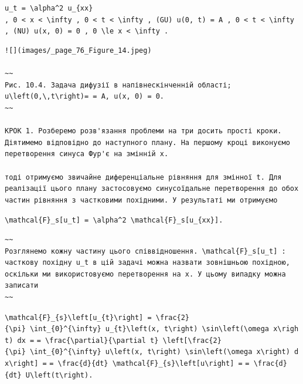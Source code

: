 \documentclass[
  ukrainian,
]{article}
\begin{document}
\texttt{u\_t\ =\ \textbackslash{}alpha\^{}2\ u\_\{xx\}}
\texttt{,\ 0\ \textless{}\ x\ \textless{}\ \textbackslash{}infty\ ,\ 0\ \textless{}\ t\ \textless{}\ \textbackslash{}infty\ ,\ (GU)\ u(0,\ t)\ =\ A\ ,\ 0\ \textless{}\ t\ \textless{}\ \textbackslash{}infty\ ,\ (NU)\ u(x,\ 0)\ =\ 0\ ,\ 0\ \textbackslash{}le\ x\ \textless{}\ \textbackslash{}infty\ .}

\begin{verbatim}
![](images/_page_76_Figure_14.jpeg)

~~
Рис. 10.4. Задача дифузії в напівнескінченній області; u\left(0,\,t\right)= = A, u(x, 0) = 0.
~~

КРОК 1. Розберемо розв'язання проблеми на три досить прості кроки. Діятимемо відповідно до наступного плану. На першому кроці виконуємо перетворення синуса Фур'є на змінній x.

тоді отримуємо звичайне диференціальне рівняння для змінної t. Для реалізації цього плану застосовуємо синусоїдальне перетворення до обох частин рівняння з частковими похідними. У результаті ми отримуємо
\end{verbatim}

\texttt{\textbackslash{}mathcal\{F\}\_s{[}u\_t{]}\ =\ \textbackslash{}alpha\^{}2\ \textbackslash{}mathcal\{F\}\_s{[}u\_\{xx\}{]}.}

\begin{verbatim}
~~
Розглянемо кожну частину цього співвідношення. \mathcal{F}_s[u_t] : часткову похідну u_t в цій задачі можна назвати зовнішньою похідною, оскільки ми використовуємо перетворення на x. У цьому випадку можна записати
~~
\end{verbatim}

\texttt{\textbackslash{}mathcal\{F\}\_\{s\}\textbackslash{}left{[}u\_\{t\}\textbackslash{}right{]}\ =\ \textbackslash{}frac\{2\}\{\textbackslash{}pi\}\ \textbackslash{}int\_\{0\}\^{}\{\textbackslash{}infty\}\ u\_\{t\}\textbackslash{}left(x,\ t\textbackslash{}right)\ \textbackslash{}sin\textbackslash{}left(\textbackslash{}omega\ x\textbackslash{}right)\ dx\ =}
\texttt{=\ \textbackslash{}frac\{\textbackslash{}partial\}\{\textbackslash{}partial\ t\}\ \textbackslash{}left{[}\textbackslash{}frac\{2\}\{\textbackslash{}pi\}\ \textbackslash{}int\_\{0\}\^{}\{\textbackslash{}infty\}\ u\textbackslash{}left(x,\ t\textbackslash{}right)\ \textbackslash{}sin\textbackslash{}left(\textbackslash{}omega\ x\textbackslash{}right)\ dx\textbackslash{}right{]}\ =}
\texttt{=\ \textbackslash{}frac\{d\}\{dt\}\ \textbackslash{}mathcal\{F\}\_\{s\}\textbackslash{}left{[}u\textbackslash{}right{]}\ =}
\texttt{=\ \textbackslash{}frac\{d\}\{dt\}\ U\textbackslash{}left(t\textbackslash{}right).}
\end{document}
